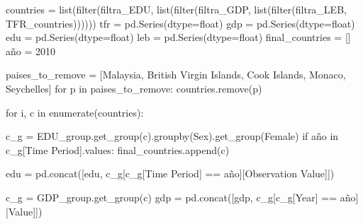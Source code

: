 \documentclass[
  letterpaper,
  DIV=11,
  numbers=noendperiod]{scrreprt}
\newenvironment{Shaded}{\begin{snugshade}}{\end{snugshade}}
\newcommand{\BuiltInTok}[1]{\textcolor[rgb]{0.00,0.23,0.31}{#1}}
\newcommand{\ControlFlowTok}[1]{\textcolor[rgb]{0.00,0.23,0.31}{#1}}
\newcommand{\DecValTok}[1]{\textcolor[rgb]{0.68,0.00,0.00}{#1}}
\newcommand{\KeywordTok}[1]{\textcolor[rgb]{0.00,0.23,0.31}{#1}}
\newcommand{\NormalTok}[1]{\textcolor[rgb]{0.00,0.23,0.31}{#1}}
\newcommand{\OperatorTok}[1]{\textcolor[rgb]{0.37,0.37,0.37}{#1}}
\newcommand{\StringTok}[1]{\textcolor[rgb]{0.13,0.47,0.30}{#1}}
\begin{document}
\begin{Shaded}
\begin{Highlighting}[]
\NormalTok{countries }\OperatorTok{=} \BuiltInTok{list}\NormalTok{(}\BuiltInTok{filter}\NormalTok{(filtra\_EDU, }\BuiltInTok{list}\NormalTok{(}\BuiltInTok{filter}\NormalTok{(filtra\_GDP, }\BuiltInTok{list}\NormalTok{(}\BuiltInTok{filter}\NormalTok{(filtra\_LEB, TFR\_countries))))))}
\NormalTok{tfr }\OperatorTok{=}\NormalTok{ pd.Series(dtype}\OperatorTok{=}\BuiltInTok{float}\NormalTok{)}
\NormalTok{gdp }\OperatorTok{=}\NormalTok{ pd.Series(dtype}\OperatorTok{=}\BuiltInTok{float}\NormalTok{)}
\NormalTok{edu }\OperatorTok{=}\NormalTok{ pd.Series(dtype}\OperatorTok{=}\BuiltInTok{float}\NormalTok{)}
\NormalTok{leb }\OperatorTok{=}\NormalTok{ pd.Series(dtype}\OperatorTok{=}\BuiltInTok{float}\NormalTok{)}
\NormalTok{final\_countries }\OperatorTok{=}\NormalTok{ []}
\NormalTok{año }\OperatorTok{=} \DecValTok{2010}

\NormalTok{paises\_to\_remove }\OperatorTok{=}\NormalTok{ [}\StringTok{\textquotesingle{}Malaysia\textquotesingle{}}\NormalTok{, }\StringTok{\textquotesingle{}British Virgin Islands\textquotesingle{}}\NormalTok{, }\StringTok{\textquotesingle{}Cook Islands\textquotesingle{}}\NormalTok{, }\StringTok{\textquotesingle{}Monaco\textquotesingle{}}\NormalTok{, }\StringTok{\textquotesingle{}Seychelles\textquotesingle{}}\NormalTok{]}
\ControlFlowTok{for}\NormalTok{ p }\KeywordTok{in}\NormalTok{ paises\_to\_remove:}
\NormalTok{    countries.remove(p)}

\ControlFlowTok{for}\NormalTok{ i, c }\KeywordTok{in} \BuiltInTok{enumerate}\NormalTok{(countries):}

\NormalTok{    c\_g }\OperatorTok{=}\NormalTok{ EDU\_group.get\_group(c).groupby(}\StringTok{\textquotesingle{}Sex\textquotesingle{}}\NormalTok{).get\_group(}\StringTok{\textquotesingle{}Female\textquotesingle{}}\NormalTok{)}
    \ControlFlowTok{if}\NormalTok{ año }\KeywordTok{in}\NormalTok{ c\_g[}\StringTok{\textquotesingle{}Time Period\textquotesingle{}}\NormalTok{].values:}
\NormalTok{        final\_countries.append(c)}
        
\NormalTok{        edu }\OperatorTok{=}\NormalTok{ pd.concat([edu, c\_g[c\_g[}\StringTok{\textquotesingle{}Time Period\textquotesingle{}}\NormalTok{] }\OperatorTok{==}\NormalTok{ año][}\StringTok{\textquotesingle{}Observation Value\textquotesingle{}}\NormalTok{]])}
    
\NormalTok{        c\_g }\OperatorTok{=}\NormalTok{ GDP\_group.get\_group(c)}
\NormalTok{        gdp }\OperatorTok{=}\NormalTok{ pd.concat([gdp, c\_g[c\_g[}\StringTok{\textquotesingle{}Year\textquotesingle{}}\NormalTok{] }\OperatorTok{==}\NormalTok{ año][}\StringTok{\textquotesingle{}Value\textquotesingle{}}\NormalTok{]])}
        

\end{Highlighting}
\end{Shaded}
\end{document}
